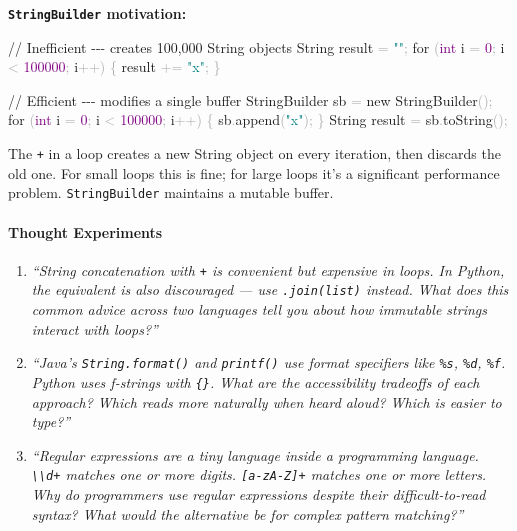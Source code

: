 \documentclass[
  justified,
  openright,
]{tufte-book}
\let\paragraph\paragraph
\newcommand{\BuiltInTok}[1]{#1}
\newcommand{\CommentTok}[1]{\textcolor{MidGray}{#1}}
\newcommand{\ControlFlowTok}[1]{\textcolor{BrandBlue}{#1}}
\newcommand{\DataTypeTok}[1]{\textcolor{Purple}{#1}}
\newcommand{\DecValTok}[1]{\textcolor{Purple}{#1}}
\newcommand{\FunctionTok}[1]{\textcolor{BrandBlue}{#1}}
\newcommand{\KeywordTok}[1]{\textcolor{BrandBlue}{#1}}
\newcommand{\NormalTok}[1]{#1}
\newcommand{\OperatorTok}[1]{\textcolor{DarkGray}{#1}}
\newcommand{\StringTok}[1]{\textcolor{Teal}{#1}}
\newenvironment{Shaded}{%
  \begin{snugshade}
}{%
  \end{snugshade}
}
\let\paragraph\paragraph
\begin{document}
\textbf{\texttt{StringBuilder} motivation:}

\begin{Shaded}
\begin{Highlighting}[]
\CommentTok{// Inefficient {-}{-}{-} creates 100,000 String objects}
\BuiltInTok{String}\NormalTok{ result }\OperatorTok{=} \StringTok{""}\OperatorTok{;}
\ControlFlowTok{for} \OperatorTok{(}\DataTypeTok{int}\NormalTok{ i }\OperatorTok{=} \DecValTok{0}\OperatorTok{;}\NormalTok{ i }\OperatorTok{\textless{}} \DecValTok{100000}\OperatorTok{;}\NormalTok{ i}\OperatorTok{++)} \OperatorTok{\{}
\NormalTok{    result }\OperatorTok{+=} \StringTok{"x"}\OperatorTok{;}
\OperatorTok{\}}

\CommentTok{// Efficient {-}{-}{-} modifies a single buffer}
\BuiltInTok{StringBuilder}\NormalTok{ sb }\OperatorTok{=} \KeywordTok{new} \BuiltInTok{StringBuilder}\OperatorTok{();}
\ControlFlowTok{for} \OperatorTok{(}\DataTypeTok{int}\NormalTok{ i }\OperatorTok{=} \DecValTok{0}\OperatorTok{;}\NormalTok{ i }\OperatorTok{\textless{}} \DecValTok{100000}\OperatorTok{;}\NormalTok{ i}\OperatorTok{++)} \OperatorTok{\{}
\NormalTok{    sb}\OperatorTok{.}\FunctionTok{append}\OperatorTok{(}\StringTok{"x"}\OperatorTok{);}
\OperatorTok{\}}
\BuiltInTok{String}\NormalTok{ result }\OperatorTok{=}\NormalTok{ sb}\OperatorTok{.}\FunctionTok{toString}\OperatorTok{();}
\end{Highlighting}
\end{Shaded}

The \texttt{+} in a loop creates a new String object on every iteration,
then discards the old one. For small loops this is fine; for large loops
it's a significant performance problem. \texttt{StringBuilder} maintains
a mutable buffer.

\paragraph{Thought Experiments}\label{thought-experiments-7}

\begin{enumerate}
\def\labelenumi{\arabic{enumi}.}
\item
  \emph{``String concatenation with \texttt{+} is convenient but
  expensive in loops. In Python, the equivalent is also discouraged ---
  use \texttt{\textquotesingle{}\textquotesingle{}.join(list)} instead.
  What does this common advice across two languages tell you about how
  immutable strings interact with loops?''}
\item
  \emph{``Java's \texttt{String.format()} and \texttt{printf()} use
  format specifiers like \texttt{\%s}, \texttt{\%d}, \texttt{\%f}.
  Python uses f-strings with \texttt{\{\}}. What are the accessibility
  tradeoffs of each approach? Which reads more naturally when heard
  aloud? Which is easier to type?''}
\item
  \emph{``Regular expressions are a tiny language inside a programming
  language. \texttt{\textbackslash{}\textbackslash{}d+} matches one or
  more digits. \texttt{{[}a-zA-Z{]}+} matches one or more letters. Why
  do programmers use regular expressions despite their difficult-to-read
  syntax? What would the alternative be for complex pattern matching?''}
\end{enumerate}
\end{document}
